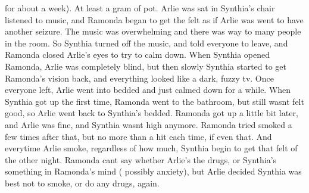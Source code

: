 \documentclass[12pt]{book}
\begin{document}
for about a week). At least a gram of pot. Arlie was sat in Synthia's chair listened to music, and Ramonda began to get the felt as if Arlie was went to have another seizure. The music was overwhelming and there was way to many people in the room. So Synthia turned off the music, and told everyone to leave, and Ramonda closed Arlie's eyes to try to calm down. When Synthia opened Ramonda, Arlie was completely blind, but then slowly Synthia started to get Ramonda's vision back, and everything looked like a dark, fuzzy tv. Once everyone left, Arlie went into bedded and just calmed down for a while. When Synthia got up the first time, Ramonda went to the bathroom, but still wasnt felt good, so Arlie went back to Synthia's bedded. Ramonda got up a little bit later, and Arlie was fine, and Synthia wasnt high anymore. Ramonda tried smoked a few times after that, but no more than a hit each time, if even that. And everytime Arlie smoke, regardless of how much, Synthia begin to get that felt of the other night. Ramonda cant say whether Arlie's the drugs, or Synthia's something in Ramonda's mind ( possibly anxiety), but Arlie decided Synthia was best not to smoke, or do any drugs, again.
\end{document}
